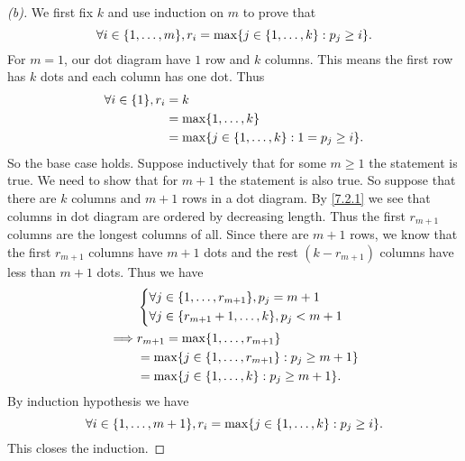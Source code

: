 \begin{proof}[(b)]
  We first fix \(k\) and use induction on \(m\) to prove that
  \[
    \forall i \in \set{1, \dots, m}, r_i = \max \set{j \in \set{1, \dots, k} : p_j \geq i}.
  \]
  For \(m = 1\), our dot diagram have \(1\) row and \(k\) columns.
  This means the first row has \(k\) dots and each column has one dot.
  Thus
  \begin{align*}
    \forall i \in \set{1}, r_i & = k                                                    \\
                               & = \max \set{1, \dots, k}                               \\
                               & = \max \set{j \in \set{1, \dots, k} : 1 = p_j \geq i}.
  \end{align*}
  So the base case holds.
  Suppose inductively that for some \(m \geq 1\) the statement is true.
  We need to show that for \(m + 1\) the statement is also true.
  So suppose that there are \(k\) columns and \(m + 1\) rows in a dot diagram.
  By \cref{7.2.1} we see that columns in dot diagram are ordered by decreasing length.
  Thus the first \(r_{m + 1}\) columns are the longest columns of all.
  Since there are \(m + 1\) rows, we know that the first \(r_{m + 1}\) columns have \(m + 1\) dots and the rest \((k - r_{m + 1})\) columns have less than \(m + 1\) dots.
  Thus we have
  \begin{align*}
             & \begin{dcases}
                 \forall j \in \set{1, \dots, r_{m + 1}}, p_j = m + 1 \\
                 \forall j \in \set{r_{m + 1} + 1, \dots, k}, p_j < m + 1
               \end{dcases} \\
    \implies & r_{m + 1} = \max \set{1, \dots, r_{m + 1}}                                   \\
             & = \max \set{j \in \set{1, \dots, r_{m + 1}} : p_j \geq m + 1}                \\
             & = \max \set{j \in \set{1, \dots, k} : p_j \geq m + 1}.
  \end{align*}
  By induction hypothesis we have
  \[
    \forall i \in \set{1, \dots, m + 1}, r_i = \max \set{j \in \set{1, \dots, k} : p_j \geq i}.
  \]
  This closes the induction.


\end{proof}
